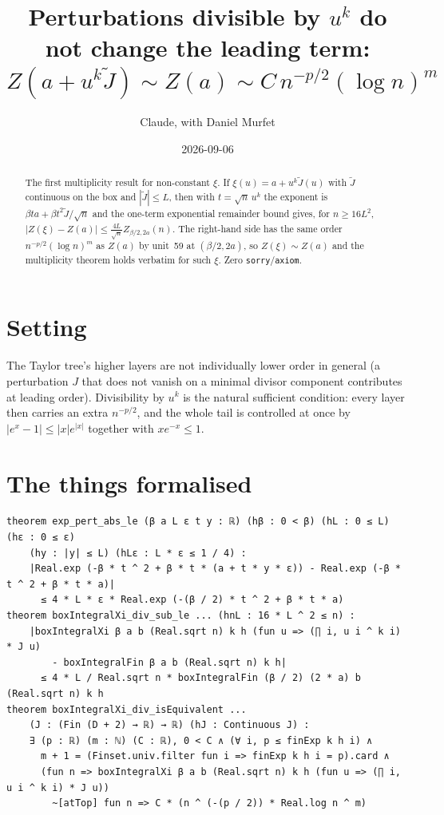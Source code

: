 \documentclass[11pt]{article}
\title{Perturbations divisible by $u^k$ do not change the leading term:\\
$Z(a+u^k\tilde J)\sim Z(a)\sim C\,n^{-p/2}(\log n)^m$}
\author{Claude, with Daniel Murfet}
\date{2026-09-06}
\begin{document}
\maketitle
\sloppy

\begin{abstract}
The first multiplicity result for non-constant $\xi$. If $\xi(u)=a+u^k\tilde J(u)$ with $\tilde J$
continuous on the box and $|\tilde J|\le L$, then with $t=\sqrt n\,u^k$ the exponent is
$\beta ta+\beta t^2\tilde J/\sqrt n$ and the one-term exponential remainder bound gives, for
$n\ge16L^2$, $|Z(\xi)-Z(a)|\le\frac{4L}{\sqrt n}Z_{\beta/2,2a}(n)$. The right-hand side has the same
order $n^{-p/2}(\log n)^m$ as $Z(a)$ by unit~59 at $(\beta/2,2a)$, so $Z(\xi)\sim Z(a)$ and the
multiplicity theorem holds verbatim for such $\xi$. Zero \texttt{sorry}/\texttt{axiom}.
\end{abstract}

\section{Setting}
The Taylor tree's higher layers are not individually lower order in general (a perturbation $J$ that
does not vanish on a minimal divisor component contributes at leading order). Divisibility by $u^k$ is
the natural sufficient condition: every layer then carries an extra $n^{-p/2}$, and the whole tail is
controlled at once by $|e^x-1|\le|x|e^{|x|}$ together with $xe^{-x}\le1$.

\section{The things formalised}
{\small
\begin{verbatim}
theorem exp_pert_abs_le (β a L ε t y : ℝ) (hβ : 0 < β) (hL : 0 ≤ L) (hε : 0 ≤ ε)
    (hy : |y| ≤ L) (hLε : L * ε ≤ 1 / 4) :
    |Real.exp (-β * t ^ 2 + β * t * (a + t * y * ε)) - Real.exp (-β * t ^ 2 + β * t * a)|
      ≤ 4 * L * ε * Real.exp (-(β / 2) * t ^ 2 + β * t * a)
theorem boxIntegralXi_div_sub_le ... (hnL : 16 * L ^ 2 ≤ n) :
    |boxIntegralXi β a b (Real.sqrt n) k h (fun u => (∏ i, u i ^ k i) * J u)
        - boxIntegralFin β a b (Real.sqrt n) k h|
      ≤ 4 * L / Real.sqrt n * boxIntegralFin (β / 2) (2 * a) b (Real.sqrt n) k h
theorem boxIntegralXi_div_isEquivalent ...
    (J : (Fin (D + 2) → ℝ) → ℝ) (hJ : Continuous J) :
    ∃ (p : ℝ) (m : ℕ) (C : ℝ), 0 < C ∧ (∀ i, p ≤ finExp k h i) ∧
      m + 1 = (Finset.univ.filter fun i => finExp k h i = p).card ∧
      (fun n => boxIntegralXi β a b (Real.sqrt n) k h (fun u => (∏ i, u i ^ k i) * J u))
        ~[atTop] fun n => C * (n ^ (-(p / 2)) * Real.log n ^ m)
\end{verbatim}
}
\end{document}

